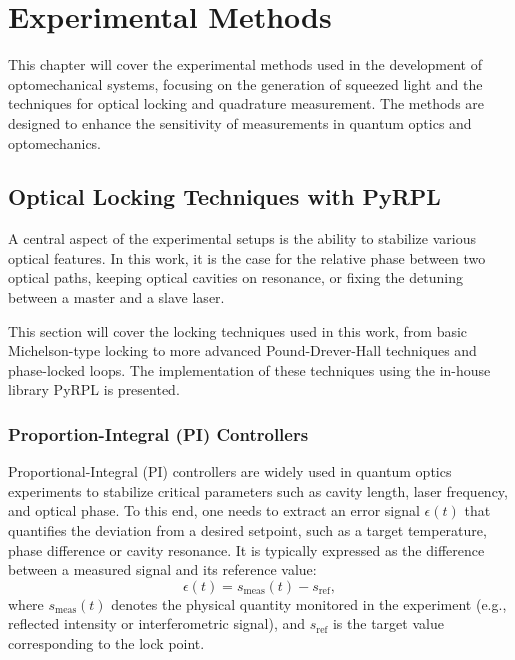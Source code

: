 \chapter{Experimental Methods}
This chapter will cover the experimental methods used in the development of optomechanical systems, focusing on the generation of squeezed light and the techniques for optical locking and quadrature measurement. The methods are designed to enhance the sensitivity of measurements in quantum optics and optomechanics.
\minitoc
\newpage
\section{Optical Locking Techniques with PyRPL}
A central aspect of the experimental setups is the ability to stabilize various optical features. In this work, it is the case for the relative phase between two optical paths, keeping optical cavities on resonance, or fixing the detuning between a master and a slave laser. \newline

\noindent This section will cover the locking techniques used in this work, from basic Michelson-type locking to more advanced Pound-Drever-Hall techniques and phase-locked loops. The implementation of these techniques using the in-house library PyRPL is presented. 

\subsection{Proportion-Integral (PI) Controllers}
Proportional-Integral (PI) controllers are widely used in quantum optics experiments to stabilize critical parameters such as cavity length, laser frequency, and optical phase. To this end, one needs to extract an error signal \( \epsilon(t) \) that quantifies the deviation from a desired setpoint, such as a target temperature, phase difference or cavity resonance. It is typically expressed as the difference between a measured signal and its reference value:
\[
\epsilon(t) = s_{\text{meas}}(t) - s_{\text{ref}},
\]
where \( s_{\text{meas}}(t) \) denotes the physical quantity monitored in the experiment (e.g., reflected intensity or interferometric signal), and \( s_{\text{ref}} \) is the target value corresponding to the lock point.\newline

